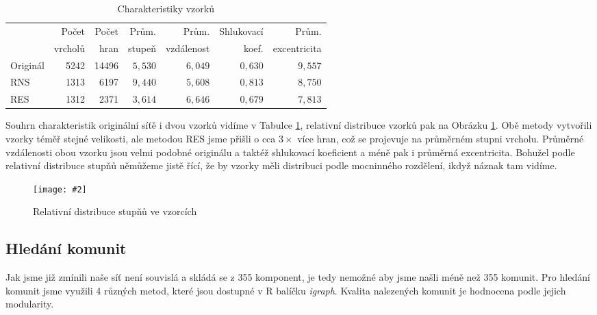 \documentclass[a4paper,12pt]{article}
\newcommand{\image}[4]{\begin{figure}[h!] \centering \texttt{[image: \#2]} \caption{#4} \label{#3} \end{figure}}
\begin{document}
\begin{table}[h!]
    \centering
    \begin{tabular}{l | r | r | r | r | r | r}
                                & Počet     & Počet & Prům.     & Prům.         & Shlukovací    & Prům. \\
                                & vrcholů   & hran  & stupeň    & vzdálenost    & koef.         & excentricita \\\hline\hline
        Originál            & 5242          & 14496 & $5,530$   & $6,049$       & $0,630$       & $9,557$       \\
        RNS                 & 1313          & 6197  & $9,440$   & $5,608$       & $0,813$       & $8,750$       \\
        RES                 & 1312          & 2371  & $3,614$   & $6,646$       & $0,679$       & $7,813$       \\
    \end{tabular}
    \caption{Charakteristiky vzorků}
    \label{tab:sampleChars}
\end{table}

Souhrn charakteristik originální síťě i dvou vzorků vidíme v Tabulce \ref{tab:sampleChars}, relativní distribuce vzorků pak na Obrázku \ref{fig:sampleDD}.
Obě metody vytvořili vzorky téměř stejné velikosti, ale metodou RES jsme přišli o cca $3 \times$ více hran, což se projevuje na průměrném stupni vrcholu. 
Průměrné vzdálenosti obou vzorku jsou velmi podobné originálu a taktéž shlukovací koeficient a méně pak i průměrná excentricita. Bohužel podle relativní
distribuce stupňů němůžeme jistě řící, že by vzorky měli distribuci podle mocninného rozdělení, ikdyž náznak tam vidíme.

\image{0.7}{../grafy/sampleDD.pdf}{fig:sampleDD}{Relativní distribuce stupňů ve vzorcích}
\FloatBarrier
\newpage

\subsection{Hledání komunit}
Jak jsme již zmínili naše síť není souvislá a skládá se z 355 komponent, je tedy nemožné aby jsme našli méně než 355 komunit.
Pro hledání komunit jsme využili 4 různých metod, které jsou dostupné v R balíčku \emph{igraph}. Kvalita nalezených komunit je hodnocena podle jejich 
modularity.
\end{document}
